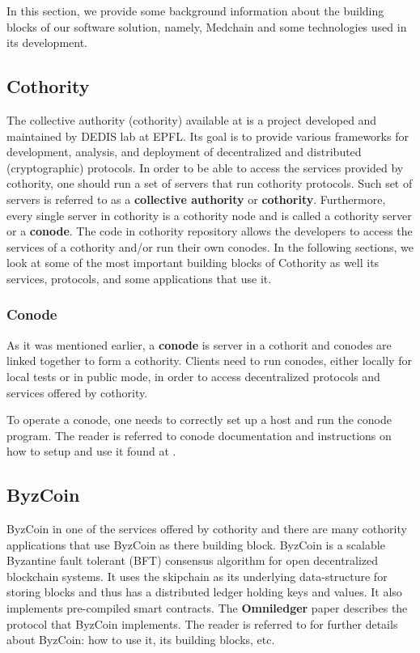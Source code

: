 In this section, we provide some background information about the building blocks of our software solution, namely, Medchain and some technologies used in its development. 

\subsection{Cothority}\label{cothority}
The collective authority (cothority) available at \cite{cothority:2019} is a project developed and maintained by DEDIS lab at EPFL. Its goal is to provide various frameworks for development, analysis, and deployment of decentralized and distributed (cryptographic) protocols. In order to be able to access the services provided by cothority, one should run a set of servers that run cothority protocols. Such set of servers is referred to as a \textbf{collective authority} or \textbf{cothority}. Furthermore, every single server in cothority is a cothority node and is called a cothority server or a \textbf{conode}. The code in cothority repository allows the developers to access the services of a cothority and/or run their own conodes. In the following sections, we look at some of the most important building blocks of Cothority as well its services, protocols, and some applications that use it.


 \subsubsection{Conode}\label{background:conode}
As it was mentioned earlier, a \textbf{conode} is server in a cothorit and conodes are linked together to form a cothority. Clients need to run conodes, either locally for local tests or in public mode, in order to access decentralized protocols and services offered by cothority.

To operate a conode, one needs to correctly set up a host and run the conode program. The reader is referred to conode documentation and instructions on how to setup and use it found at \cite{conode:2019}.

\subsection{ByzCoin}\label{background:byzcoin}
ByzCoin in one of the services offered by cothority and there are many cothority applications that use ByzCoin as there building block. ByzCoin is a scalable Byzantine fault tolerant (BFT) consensus algorithm for open decentralized blockchain systems. It uses the skipchain \cite{skipchain:2019} as its underlying data-structure for storing blocks and thus has a distributed ledger holding keys and values. It also implements pre-compiled smart contracts. The \textbf{Omniledger} paper \cite{kokoris2018omniledger} describes the protocol that ByzCoin implements. The reader is referred to \cite{byzcoin:2019} for further details about ByzCoin: how to use it, its building blocks, etc. 

